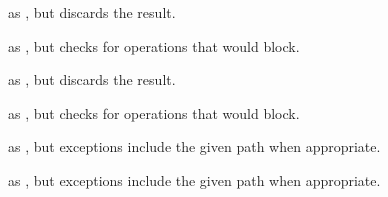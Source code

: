 \begin{haddockdesc}
\item[\begin{tabular}{@{}l}
throwErrnoIfRetryMayBlock{\char '137} :: (a -> Bool) -> String -> IO a -> IO b -> IO ()
\end{tabular}]
{\haddockbegindoc
as , but discards the result.\par}
\end{haddockdesc}
\begin{haddockdesc}
\item[\begin{tabular}{@{}l}
throwErrnoIfMinus1RetryMayBlock :: (Eq a, Num a) => String -> IO a -> IO b -> IO a
\end{tabular}]
{\haddockbegindoc
as , but checks for operations that would block.\par}
\end{haddockdesc}
\begin{haddockdesc}
\item[\begin{tabular}{@{}l}
throwErrnoIfMinus1RetryMayBlock{\char '137} :: (Eq a, Num a) => String -> IO a -> IO b -> IO ()
\end{tabular}]
{\haddockbegindoc
as , but discards the result.\par}
\end{haddockdesc}
\begin{haddockdesc}
\item[\begin{tabular}{@{}l}
throwErrnoIfNullRetryMayBlock :: String -> IO (Ptr a) -> IO b -> IO (Ptr a)
\end{tabular}]
{\haddockbegindoc
as , but checks for operations that would block.\par}
\end{haddockdesc}
\begin{haddockdesc}
\item[\begin{tabular}{@{}l}
throwErrnoPath :: String -> FilePath -> IO a
\end{tabular}]
{\haddockbegindoc
as , but exceptions include the given path when appropriate.\par}
\end{haddockdesc}
\begin{haddockdesc}
\item[\begin{tabular}{@{}l}
throwErrnoPathIf :: (a -> Bool) -> String -> FilePath -> IO a -> IO a
\end{tabular}]
{\haddockbegindoc
as , but exceptions include the given path when
   appropriate.\par}
\end{haddockdesc}
